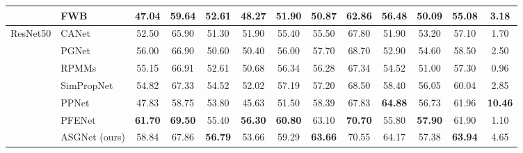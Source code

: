 \begin{table*}[htbp]
\begin{center}
\begin{tabular}{|l|l|ccccc|ccccc|c|}
                                                & FWB \cite{fwb}                      & 47.04          & 59.64          & 52.61          & 48.27          & 51.90                               & 50.87          & 62.86          & 56.48          & 50.09          & 55.08                               & 3.18                      \\ \hline
\multirow{7}{*}{ResNet50}                       & CANet \cite{canet}                    & 52.50          & 65.90          & 51.30          & 51.90          & 55.40                               & 55.50          & 67.80          & 51.90          & 53.20          & 57.10                               & 1.70                      \\
                                                & PGNet \cite{pgnet}                    & 56.00          & 66.90          & 50.60          & 50.40          & 56.00                               & 57.70          & 68.70          & 52.90          & 54.60          & 58.50                               & 2.50                      \\
                                                & RPMMs \cite{pmms}                     & 55.15          & 66.91          & 52.61          & 50.68          & 56.34                               & 56.28          & 67.34          & 54.52          & 51.00          & 57.30                               & 0.96                      \\
& SimPropNet \cite{simprop}               & 54.82          & 67.33          & 54.52          & 52.02          & 57.19                               & 57.20          & 68.50          & 58.40          & 56.05          & 60.04                               & 2.85                      \\
& PPNet \cite{ppnet}       & 47.83          & 58.75 & 53.80 & 45.63          & 51.50                               & 58.39          & 67.83          & \textbf{64.88}          & 56.73          & 61.96                               & \textbf{10.46} \\
 & PFENet \cite{pfenet}       & \textbf{61.70}          & \textbf{69.50} & 55.40 & \textbf{56.30}          & \textbf{60.80}                               & 63.10          & \textbf{70.70}          & 55.80          & \textbf{57.90}          & 61.90                               & 1.10 \\
 & ASGNet (ours) & 58.84 & 67.86          & \textbf{56.79}         & 53.66  & 59.29 & \textbf{63.66} & 70.55 & 64.17 & 57.38 & \textbf{63.94} & 4.65                      \\ \hline

\end{tabular}
\end{center}
\end{table*}
